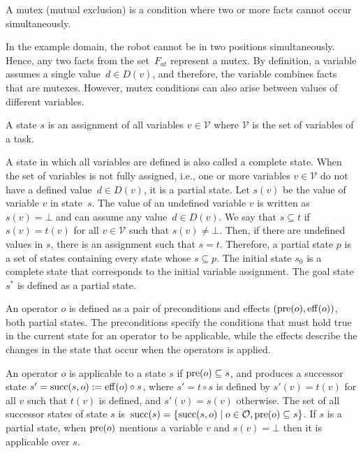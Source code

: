 \begin{definition}[Mutex]\label{def:mutex}
    A mutex (mutual exclusion) is a condition where two or more facts cannot occur simultaneously.
\end{definition}

In the example domain, the robot cannot be in two positions simultaneously. Hence, any two facts from the set~$F_{at}$ represent a mutex. By definition, a variable assumes a single value~$d \in D(v)$, and therefore, the variable combines facts that are mutexes. However, mutex conditions can also arise between values of different variables.

\begin{definition}[State]\label{def:state}
    A state $s$ is an assignment of all variables $v \in \mathcal{V}$ where $\mathcal{V}$ is the set of variables of a task.
\end{definition}

A state in which all variables are defined is also called a complete state. When the set of variables is not fully assigned, i.e., one or more variables $v \in \mathcal{V}$ do not have a defined value~$d \in D(v)$, it is a partial state. Let $s(v)$ be the value of variable $v$ in state~$s$. The value of an undefined variable $v$ is written as $s(v) = \bot$ and can assume any value~$d \in D(v)$. We say that $s \subseteq t$ if $s(v) = t(v)$ for all $v \in \mathcal{V}$ such that $s(v) \neq \bot$. Then, if there are undefined values in $s$, there is an assignment such that $s = t$. Therefore, a partial state $p$ is a set of states containing every state whose $s \subseteq p$. The initial state $s_0$ is a complete state that corresponds to the initial variable assignment. The goal state $s^*$ is defined as a partial state.

\begin{definition}[Operator]\label{def:operator}
    An operator $o$ is defined as a pair of preconditions and effects $(\operatorname{pre}(o),\operatorname{eff}(o))$, both partial states. The preconditions specify the conditions that must hold true in the current state for an operator to be applicable, while the effects describe the changes in the state that occur when the operators is applied.
\end{definition}

An operator $o$ is applicable to a state $s$ if $\operatorname{pre}(o) \subseteq s$, and produces a successor state $s' = \operatorname{succ}(s,o) := \operatorname{eff}(o) \circ s$, where $s' = t \circ s$ is defined by $s'(v) = t(v)$ for all $v$ such that $t(v)$ is defined, and $s'(v) = s(v)$ otherwise. The set of all successor states of state $s$ is~$\operatorname{succ}(s)=\{\operatorname{succ}(s,o)\mid o\in \mathcal{O}, \operatorname{pre}(o) \subseteq s\}$. If $s$ is a partial state, when $\operatorname{pre}(o)$ mentions a variable $v$ and $s(v) = \bot$ then it is applicable over $s$.

